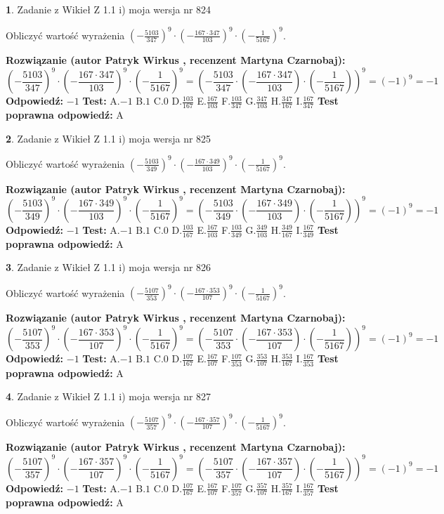 \documentclass[12pt, a4paper]{article}
\theoremstyle{definition} %
\newtheorem{zad}{}
\newcommand{\zadStart}[1]{\begin{zad}#1\newline}
\newcommand{\zadStop}{\end{zad}}
\newcommand{\rozwStart}[2]{\noindent \textbf{Rozwiązanie (autor #1 , recenzent #2): }\newline}
\newcommand{\rozwStop}{\newline}
\newcommand{\odpStart}{\noindent \textbf{Odpowiedź:}\newline}
\newcommand{\odpStop}{\newline}
\newcommand{\testStart}{\noindent \textbf{Test:}\newline}
\newcommand{\testStop}{\newline}
\newcommand{\kluczStart}{\noindent \textbf{Test poprawna odpowiedź:}\newline}
\newcommand{\kluczStop}{\newline}
\begin{document}
\zadStart{Zadanie z Wikieł Z 1.1 i) moja wersja nr 824}

Obliczyć wartość wyrażenia $(-\frac{5103}{347})^{9} \cdot (-\frac{167 \cdot 347}{103})^{9} \cdot (-\frac{1}{5167})^{9}$.
\zadStop
\rozwStart{Patryk Wirkus}{Martyna Czarnobaj}
$$(-\frac{5103}{347})^{9} \cdot (-\frac{167 \cdot 347}{103})^{9} \cdot (-\frac{1}{5167})^{9} = (-\frac{5103}{347} \cdot (-\frac{167 \cdot 347}{103}) \cdot (-\frac{1}{5167}))^{9} = (-1)^{9} = -1$$
\rozwStop
\odpStart
$-1$
\odpStop
\testStart
A.$-1$ B.$1$ C.$0$ D.$\frac{103}{167}$ E.$\frac{167}{103}$
F.$\frac{103}{347}$ G.$\frac{347}{103}$
H.$\frac{347}{167}$
I.$\frac{167}{347}$
\testStop
\kluczStart
A
\kluczStop



\zadStart{Zadanie z Wikieł Z 1.1 i) moja wersja nr 825}

Obliczyć wartość wyrażenia $(-\frac{5103}{349})^{9} \cdot (-\frac{167 \cdot 349}{103})^{9} \cdot (-\frac{1}{5167})^{9}$.
\zadStop
\rozwStart{Patryk Wirkus}{Martyna Czarnobaj}
$$(-\frac{5103}{349})^{9} \cdot (-\frac{167 \cdot 349}{103})^{9} \cdot (-\frac{1}{5167})^{9} = (-\frac{5103}{349} \cdot (-\frac{167 \cdot 349}{103}) \cdot (-\frac{1}{5167}))^{9} = (-1)^{9} = -1$$
\rozwStop
\odpStart
$-1$
\odpStop
\testStart
A.$-1$ B.$1$ C.$0$ D.$\frac{103}{167}$ E.$\frac{167}{103}$
F.$\frac{103}{349}$ G.$\frac{349}{103}$
H.$\frac{349}{167}$
I.$\frac{167}{349}$
\testStop
\kluczStart
A
\kluczStop



\zadStart{Zadanie z Wikieł Z 1.1 i) moja wersja nr 826}

Obliczyć wartość wyrażenia $(-\frac{5107}{353})^{9} \cdot (-\frac{167 \cdot 353}{107})^{9} \cdot (-\frac{1}{5167})^{9}$.
\zadStop
\rozwStart{Patryk Wirkus}{Martyna Czarnobaj}
$$(-\frac{5107}{353})^{9} \cdot (-\frac{167 \cdot 353}{107})^{9} \cdot (-\frac{1}{5167})^{9} = (-\frac{5107}{353} \cdot (-\frac{167 \cdot 353}{107}) \cdot (-\frac{1}{5167}))^{9} = (-1)^{9} = -1$$
\rozwStop
\odpStart
$-1$
\odpStop
\testStart
A.$-1$ B.$1$ C.$0$ D.$\frac{107}{167}$ E.$\frac{167}{107}$
F.$\frac{107}{353}$ G.$\frac{353}{107}$
H.$\frac{353}{167}$
I.$\frac{167}{353}$
\testStop
\kluczStart
A
\kluczStop



\zadStart{Zadanie z Wikieł Z 1.1 i) moja wersja nr 827}

Obliczyć wartość wyrażenia $(-\frac{5107}{357})^{9} \cdot (-\frac{167 \cdot 357}{107})^{9} \cdot (-\frac{1}{5167})^{9}$.
\zadStop
\rozwStart{Patryk Wirkus}{Martyna Czarnobaj}
$$(-\frac{5107}{357})^{9} \cdot (-\frac{167 \cdot 357}{107})^{9} \cdot (-\frac{1}{5167})^{9} = (-\frac{5107}{357} \cdot (-\frac{167 \cdot 357}{107}) \cdot (-\frac{1}{5167}))^{9} = (-1)^{9} = -1$$
\rozwStop
\odpStart
$-1$
\odpStop
\testStart
A.$-1$ B.$1$ C.$0$ D.$\frac{107}{167}$ E.$\frac{167}{107}$
F.$\frac{107}{357}$ G.$\frac{357}{107}$
H.$\frac{357}{167}$
I.$\frac{167}{357}$
\testStop
\kluczStart
A
\kluczStop
\end{document}
